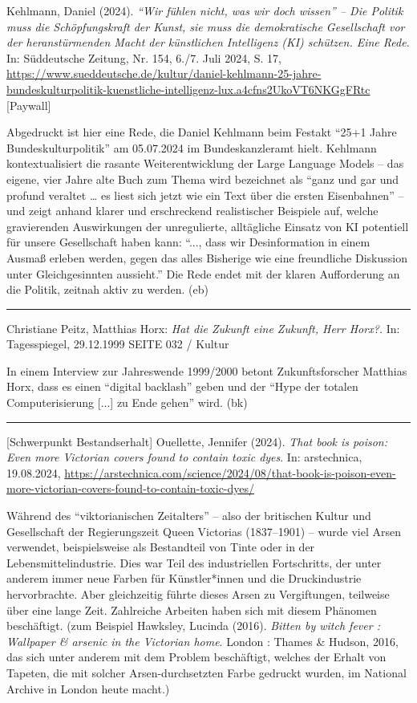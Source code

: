 \documentclass[a4paper,
fontsize=11pt,
oneside,
numbers=noperiodatend,
parskip=half-,
bibliography=totoc,
final
]{scrartcl}
\begin{document}
Kehlmann, Daniel (2024). \emph{``Wir fühlen nicht, was wir doch wissen''
-- Die Politik muss die Schöpfungskraft der Kunst, sie muss die
demokratische Gesellschaft vor der heranstürmenden Macht der künstlichen
Intelligenz (KI) schützen. Eine Rede.} In: Süddeutsche Zeitung, Nr. 154,
6./7. Juli 2024, S. 17,
\url{https://www.sueddeutsche.de/kultur/daniel-kehlmann-25-jahre-bundeskulturpolitik-kuenstliche-intelligenz-lux.a4cfns2UkoVT6NKGgFRtc}
{[}Paywall{]}

Abgedruckt ist hier eine Rede, die Daniel Kehlmann beim Festakt ``25+1
Jahre Bundeskulturpolitik'' am 05.07.2024 im Bundeskanzleramt hielt.
Kehlmann kontextualisiert die rasante Weiterentwicklung der Large
Language Models -- das eigene, vier Jahre alte Buch zum Thema wird
bezeichnet als ``ganz und gar und profund veraltet \ldots{} es liest
sich jetzt wie ein Text über die ersten Eisenbahnen'' -- und zeigt
anhand klarer und erschreckend realistischer Beispiele auf, welche
gravierenden Auswirkungen der unregulierte, alltägliche Einsatz von KI
potentiell für unsere Gesellschaft haben kann: ``..., dass wir
Desinformation in einem Ausmaß erleben werden, gegen das alles Bisherige
wie eine freundliche Diskussion unter Gleichgesinnten aussieht.'' Die
Rede endet mit der klaren Aufforderung an die Politik, zeitnah aktiv zu
werden. (eb)

\begin{center}\rule{0.5\linewidth}{0.5pt}\end{center}

Christiane Peitz, Matthias Horx: \emph{Hat die Zukunft eine Zukunft,
Herr Horx?.} In: Tagesspiegel, 29.12.1999 SEITE 032 / Kultur

In einem Interview zur Jahreswende 1999/2000 betont Zukunftsforscher
Matthias Horx, dass es einen ``digital backlash'' geben und der ``Hype
der totalen Computerisierung {[}...{]} zu Ende gehen'' wird. (bk)

\begin{center}\rule{0.5\linewidth}{0.5pt}\end{center}

{[}Schwerpunkt Bestandserhalt{]} Ouellette, Jennifer (2024). \emph{That
book is poison: Even more Victorian covers found to contain toxic dyes}.
In: arstechnica, 19.08.2024,
\url{https://arstechnica.com/science/2024/08/that-book-is-poison-even-more-victorian-covers-found-to-contain-toxic-dyes/}

Während des ``viktorianischen Zeitalters'' -- also der britischen Kultur
und Gesellschaft der Regierungszeit Queen Victorias (1837--1901) --
wurde viel Arsen verwendet, beispielsweise als Bestandteil von Tinte
oder in der Lebensmittelindustrie. Dies war Teil des industriellen
Fortschritts, der unter anderem immer neue Farben für Künstler*innen und
die Druckindustrie hervorbrachte. Aber gleichzeitig führte dieses Arsen
zu Vergiftungen, teilweise über eine lange Zeit. Zahlreiche Arbeiten
haben sich mit diesem Phänomen beschäftigt. (zum Beispiel Hawksley,
Lucinda (2016). \emph{Bitten by witch fever : Wallpaper \& arsenic in
the Victorian home}. London : Thames \& Hudson, 2016, das sich unter
anderem mit dem Problem beschäftigt, welches der Erhalt von Tapeten, die
mit solcher Arsen-durchsetzten Farbe gedruckt wurden, im National
Archive in London heute macht.)
\end{document}
